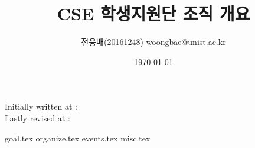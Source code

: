 \documentclass[12pt, a4paper]{article}
\title{\Huge \Huge CSE 학생지원단 조직 개요}
\author{전웅배(20161248) woongbae@unist.ac.kr \normalsize}
\date{}
\begin{document}
 \maketitle

Initially written at : \\
Lastly revised at : \date{\today}

\newpage

\tableofcontents

\newpage

{goal.tex}
{organize.tex}
{events.tex}
{misc.tex}
\end{document}
